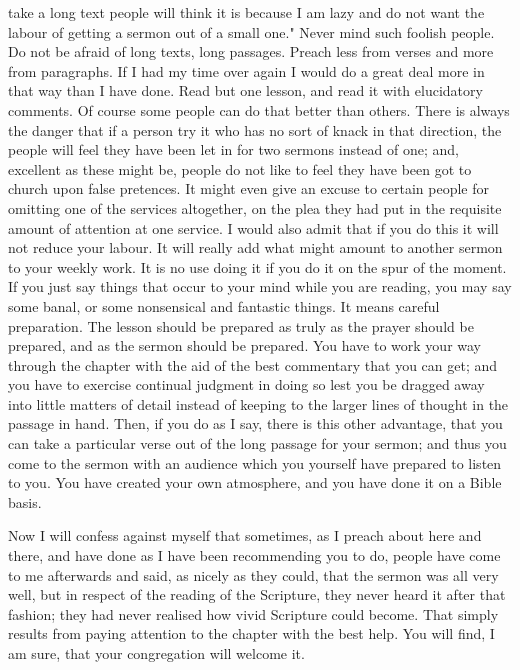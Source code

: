 \documentclass[draft]{ptfdoc}
\begin{document}
take a long text people will think it is because 
I am lazy and do not want the labour of getting 
a sermon out of a small one." Never mind such 
foolish people. Do not be afraid of long texts, 
long passages. Preach less from verses and 
more from paragraphs. If I had my time over 
again I would do a great deal more in that way 
than I have done. Read but one lesson, and read 
it with elucidatory comments. Of course some 
people can do that better than others. There 
is always the danger that if a person try it who 
has no sort of knack in that direction, the people 
will feel they have been let in for two sermons 
instead of one; and, excellent as these might 
be, people do not like to feel they have been got 
to church upon false pretences. It might even 
give an excuse to certain people for omitting 
one of the services altogether, on the plea they 
had put in the requisite amount of attention at 
one service. I would also admit that if you do 
this it will not reduce your labour. It will really 
add what might amount to another sermon to 
your weekly work. It is no use doing it if you 
do it on the spur of the moment. If you just say 
things that occur to your mind while you are 
reading, you may say some banal, or some nonsensical 
and fantastic things. It means careful 
preparation. The lesson should be prepared as 
truly as the prayer should be prepared, and as 
the sermon should be prepared. You have to 
work your way through the chapter with the 
aid of the best commentary that you can get; 
and you have to exercise continual judgment in 
doing so lest you be dragged away into little 
matters of detail instead of keeping to the 
larger lines of thought in the passage in hand. 
Then, if you do as I say, there is this other 
advantage, that you can take a particular verse 
out of the long passage for your sermon; and 
thus you come to the sermon with an audience 
which you yourself have prepared to listen to 
you. You have created your own atmosphere, 
and you have done it on a Bible basis. 

Now I will confess against myself that sometimes, 
as I preach about here and there, and 
have done as I have been recommending you to 
do, people have come to me afterwards and said, 
as nicely as they could, that the sermon was all 
very well, but in respect of the reading of the 
Scripture, they never heard it after that fashion; 
they had never realised how vivid Scripture 
could become. That simply results from paying 
attention to the chapter with the best help. 
You will find, I am sure, that your congregation 
will welcome it.
\end{document}
